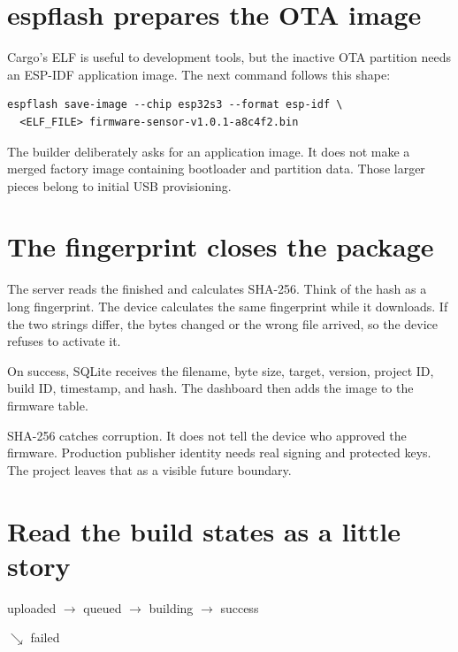\section{espflash prepares the OTA image}

Cargo's ELF is useful to development tools, but the inactive OTA partition needs an ESP-IDF application image. The next command follows this shape:

\begin{lstlisting}
espflash save-image --chip esp32s3 --format esp-idf \
  <ELF_FILE> firmware-sensor-v1.0.1-a8c4f2.bin
\end{lstlisting}

The builder deliberately asks for an application image. It does not make a merged factory image containing bootloader and partition data. Those larger pieces belong to initial USB provisioning.

\section{The fingerprint closes the package}

The server reads the finished  and calculates SHA-256. Think of the hash as a long fingerprint. The device calculates the same fingerprint while it downloads. If the two strings differ, the bytes changed or the wrong file arrived, so the device refuses to activate it.

On success, SQLite receives the filename, byte size, target, version, project ID, build ID, timestamp, and hash. The dashboard then adds the image to the firmware table.

\begin{mentorbox}
SHA-256 catches corruption. It does not tell the device who approved the firmware. Production publisher identity needs real signing and protected keys. The project leaves that as a visible future boundary.
\end{mentorbox}

\section{Read the build states as a little story}

\begin{center}
\ttfamily uploaded $\rightarrow$ queued $\rightarrow$ building $\rightarrow$ success\par
\hspace*{7.4cm}$\searrow$ failed
\end{center}

